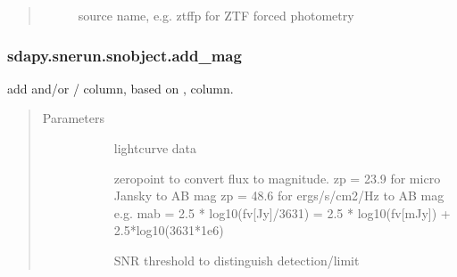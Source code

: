 \documentclass[letterpaper,10pt,english]{sphinxmanual}
\begin{document}
\begin{fulllineitems}
\begin{fulllineitems}
\begin{quote}
\begin{description}
\begin{description}
\item[{}] \leavevmode{[}\sphinxtitleref{str}{]}
source name, e.g. ztffp for ZTF forced photometry

\end{description}

\end{description}\end{quote}

\end{fulllineitems}



\subsubsection{sdapy.snerun.snobject.add\_mag}
\label{\detokenize{generated/sdapy.snerun.snobject.add_mag:sdapy-snerun-snobject-add-mag}}\label{\detokenize{generated/sdapy.snerun.snobject.add_mag::doc}}

\begin{fulllineitems}
\label{\detokenize{generated/sdapy.snerun.snobject.add_mag:sdapy.snerun.snobject.add_mag}}
add  and/or / column, based on ,  column.
\begin{quote}\begin{description}
\item[{Parameters}] \leavevmode\begin{description}
\item[{}] \leavevmode{[}\sphinxtitleref{panda.dataframe}{]}
lightcurve data

\item[{}] \leavevmode{[}\sphinxtitleref{float}{]}
zeropoint to convert flux to magnitude.
zp = 23.9 for micro Jansky to AB mag
zp = 48.6 for ergs/s/cm2/Hz to AB mag
e.g. mab = \sphinxhyphen{}2.5 * log10(fv{[}Jy{]}/3631) = \sphinxhyphen{}2.5 * log10(fv{[}mJy{]}) + 2.5*log10(3631*1e6)

\item[{}] \leavevmode{[}\sphinxtitleref{float}{]}
SNR threshold to distinguish detection/limit


\end{description}
\end{description}
\end{quote}
\end{fulllineitems}
\end{fulllineitems}
\end{document}
